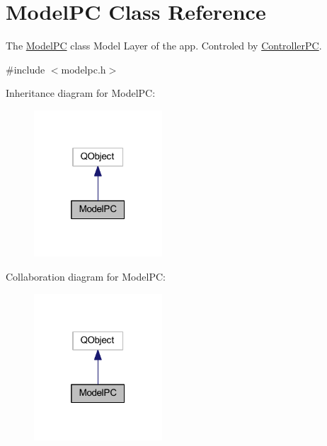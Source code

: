 \hypertarget{class_model_p_c}{}\section{Model\+PC Class Reference}
\label{class_model_p_c}


The \mbox{\hyperlink{class_model_p_c}{Model\+PC}} class Model Layer of the app. Controled by \mbox{\hyperlink{class_controller_p_c}{Controller\+PC}}.  




{\ttfamily \#include $<$modelpc.\+h$>$}



Inheritance diagram for Model\+PC\+:
\nopagebreak
\begin{figure}[H]
\begin{center}
\leavevmode
\includegraphics[width=136pt]{class_model_p_c__inherit__graph}
\end{center}
\end{figure}


Collaboration diagram for Model\+PC\+:
\nopagebreak
\begin{figure}[H]
\begin{center}
\leavevmode
\includegraphics[width=136pt]{class_model_p_c__coll__graph}
\end{center}
\end{figure}
